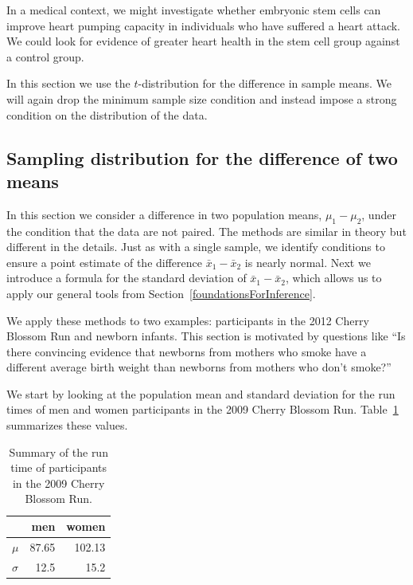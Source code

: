 In a medical context, we might investigate whether embryonic stem cells can improve heart pumping capacity in individuals who have suffered a heart attack. We could look for evidence of greater heart health in the stem cell group against a control group.

In this section we use the $t$-distribution for the difference in sample means. We will again drop the minimum sample size condition and instead impose a strong condition on the distribution of the data.


\subsection{Sampling distribution for the difference of two means}
\label{differenceOfTwoMeans}

In this section we consider a difference in two population means, $\mu_1 - \mu_2$, under the condition that the data are not paired. The methods are similar in theory but different in the details. Just as with a single sample, we identify conditions to ensure a point estimate of the difference $\bar{x}_1 - \bar{x}_2$ is nearly normal. Next we introduce a formula for the standard deviation of $\bar{x}_1 - \bar{x}_2$, which allows us to apply our general tools from Section~\ref{foundationsForInference}.

We apply these methods to two examples: participants in the 2012 Cherry Blossom Run and newborn infants. This section is motivated by questions like ``Is there convincing evidence that newborns from mothers who smoke have a different average birth weight than newborns from mothers who don't smoke?''


We start by looking at the population mean and standard deviation  for the run times of men and women participants in the 2009 Cherry Blossom Run. Table~\ref{cherryBlossomRun2009SampleOf180SummaryStats} summarizes these values.

\begin{table}[h]
\centering
\begin{tabular}{l rr}
\hline
	&	men	&	women \\
\hline
$\mu$	& 87.65	& 102.13 \\
$\sigma$	&	12.5		& 15.2 \\
\hline
\end{tabular}
\caption{Summary of the run time of participants in the 2009 Cherry Blossom Run.}
\label{cherryBlossomRun2009SampleOf180SummaryStats}
\end{table}

